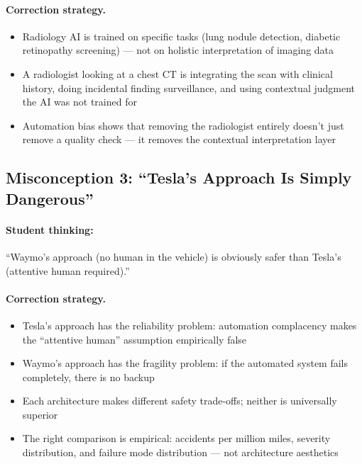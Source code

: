 \paragraph{Correction strategy.}
\begin{itemize}
    \item Radiology AI is trained on specific tasks (lung nodule detection, diabetic retinopathy screening) --- not on holistic interpretation of imaging data
    \item A radiologist looking at a chest CT is integrating the scan with clinical history, doing incidental finding surveillance, and using contextual judgment the AI was not trained for
    \item Automation bias shows that removing the radiologist entirely doesn't just remove a quality check --- it removes the contextual interpretation layer
\end{itemize}

\subsection{Misconception 3: ``Tesla's Approach Is Simply Dangerous''}

\paragraph{Student thinking:} ``Waymo's approach (no human in the vehicle) is obviously safer than Tesla's (attentive human required).''

\paragraph{Correction strategy.}
\begin{itemize}
    \item Tesla's approach has the reliability problem: automation complacency makes the ``attentive human'' assumption empirically false
    \item Waymo's approach has the fragility problem: if the automated system fails completely, there is no backup
    \item Each architecture makes different safety trade-offs; neither is universally superior
    \item The right comparison is empirical: accidents per million miles, severity distribution, and failure mode distribution --- not architecture aesthetics
\end{itemize}

